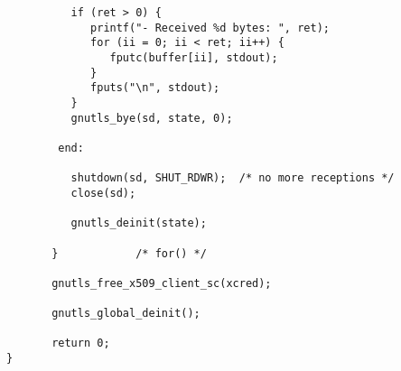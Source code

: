 \begin{verbatim}
	      if (ret > 0) {
		     printf("- Received %d bytes: ", ret);
		     for (ii = 0; ii < ret; ii++) {
			    fputc(buffer[ii], stdout);
		     }
		     fputs("\n", stdout);
	      }
	      gnutls_bye(sd, state, 0);

	    end:

	      shutdown(sd, SHUT_RDWR);	/* no more receptions */
	      close(sd);

	      gnutls_deinit(state);

       }			/* for() */

       gnutls_free_x509_client_sc(xcred);

       gnutls_global_deinit();

       return 0;
}

\end{verbatim}
